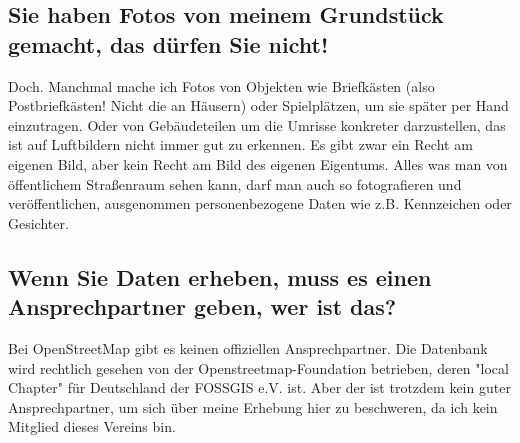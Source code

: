 \documentclass[10pt,foldmark,notumble]{leaflet}
\begin{document}
    \subsection{Sie haben Fotos von meinem Grundstück gemacht, das dürfen Sie nicht!}
    Doch.
    Manchmal mache ich Fotos von Objekten wie Briefkästen (also Postbriefkästen! Nicht die an Häusern) oder Spielplätzen, um sie später per Hand einzutragen.
    Oder von Gebäudeteilen um die Umrisse konkreter darzustellen, das ist auf Luftbildern nicht immer gut zu erkennen.
    Es gibt zwar ein Recht am eigenen Bild, aber kein Recht am Bild des eigenen Eigentums.
    Alles was man von öffentlichem Straßenraum sehen kann, darf man auch so fotografieren und veröffentlichen, ausgenommen personenbezogene Daten wie z.B. Kennzeichen oder Gesichter.

    \subsection{Wenn Sie Daten erheben, muss es einen Ansprechpartner geben, wer ist das?}
    Bei OpenStreetMap gibt es keinen offiziellen Ansprechpartner.
    Die Datenbank wird rechtlich gesehen von der Openstreetmap-Foundation betrieben, deren "local Chapter" für Deutschland der FOSSGIS e.V. ist.
    Aber der ist trotzdem kein guter Ansprechpartner, um sich über meine Erhebung hier zu beschweren, da ich kein Mitglied dieses Vereins bin.
\end{document}
